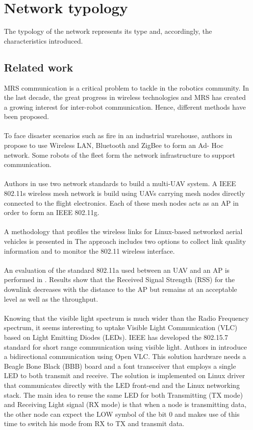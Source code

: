 \documentclass[11pt,openany]{book}
\begin{document}
\section{Network typology}
The typology of the network represents its type and, accordingly, the characteristics introduced.
\subsection{Related work}
MRS communication is a critical problem to tackle in the robotics community. In the last decade, the great progress in wireless technologies and MRS has created a growing interest for inter-robot communication. Hence, diﬀerent methods have been proposed.\\\\
To face disaster scenarios such as ﬁre in an industrial warehouse, authors in \cite{witkowski2008ad} propose to use Wireless LAN, Bluetooth and ZigBee to form an Ad- Hoc network. Some robots of the ﬂeet form the network infrastructure to support communication.\\\\
Authors in \cite{morgenthaler2012uavnet} use two network standards to build a multi-UAV system. A IEEE 802.11s wireless mesh network is build using UAVs carrying mesh nodes directly connected to the ﬂight electronics. Each of these mesh nodes acts as an AP in order to form an IEEE 802.11g.\\\\
A methodology that proﬁles the wireless links for Linux-based networked aerial vehicles is presented in \cite{kuschnig2012profiling.} The approach includes two options to collect link quality information and to monitor the 802.11 wireless interface.\\\\
An evaluation of the standard 802.11a used between an UAV and an AP is performed in \cite{kuschnig2012profiling}. Results show that the Received Signal Strength (RSS) for the downlink decreases with the distance to the AP but remains at an acceptable level as well as the throughput.\\\\
Knowing that the visible light spectrum is much wider than the Radio Frequency spectrum, it seems interesting to uptake Visible Light Communication (VLC) based on Light Emitting Diodes (LEDs). IEEE has developed the 802.15.7 standard for short range communication using visible light. Authors in \cite{wang2014openvlc} introduce a bidirectional communication using Open VLC. This solution hardware needs a Beagle Bone Black (BBB) board and a font transceiver that employs a single LED to both transmit and receive. The solution is implemented on Linux driver that communicates directly with the LED front-end and the Linux networking stack. The main idea to reuse the same LED for both Transmitting (TX mode) and Receiving Light signal (RX mode) is that when a node is transmitting data, the other node can expect the LOW symbol of the bit 0 and makes use of this time to switch his mode from RX to TX and transmit data.\\\\
\end{document}
